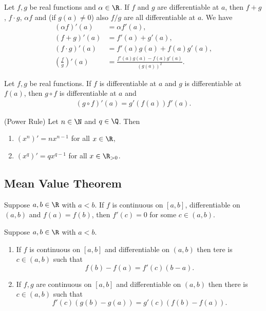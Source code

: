 \documentclass{article}
\begin{document}
\begin{theorem}[Ross, 28.3]
    Let $f,g$ be real functions and $\alpha\in\R$. If $f$ and $g$ are
    differentiable at $a$, then $f+g$, $f\cdot g$, $\alpha f$ and
    (if $g(a)\not=0$) also $f/g$ are all differentiable at $a$. We have
    \begin{align*}
        (\alpha f)'(a) &= \alpha f'(a),\\
        (f+g)'(a) &= f'(a) + g'(a),\\
        (f\cdot g)'(a) &= f'(a)g(a)+f(a)g'(a),\\
        \left(\frac{f}{g}\right)'(a)&=\frac{f'(a)g(a)-f(a)g'(a)}{(g(a))^2}.
    \end{align*} 
\end{theorem}

\begin{theorem}[Ross, 28.4]
    Let $f,g$ be real functions. If $f$ is differentiable at $a$ and $g$ is
    differentiable at $f(a)$, then $g\circ f$ is differentiable at $a$ and
    \begin{align*}
        (g\circ f)'(a) = g'(f(a))f'(a).
    \end{align*} 
\end{theorem}

\begin{theorem}(Power Rule)
    Let $n\in \N$ and $q\in\Q$. Then
    \begin{enumerate}[label=(\arabic*)]
        \item $(x^n)'=nx^{n-1}$ for all $x\in\R$,
        \item $(x^q)'=qx^{q-1}$ for all $x\in\R_{>0}$. 
    \end{enumerate} 
\end{theorem}

\subsection{Mean Value Theorem}

\begin{theorem}
    Suppose $a,b\in\R$ with $a<b$. If $f$ is continuous on $[a,b]$,
    differentiable on $(a,b)$ and $f(a)=f(b)$, then $f'(c)=0$ for some
    $c\in(a,b)$.
\end{theorem}

\begin{theorem}
    Suppose $a,b\in\R$ with $a<b$.
    \begin{enumerate}
        \item If $f$ is continuous on $[a,b]$ and differentiable on $(a,b)$
        then tere is $c\in(a,b)$ such that \[f(b)-f(a)=f'(c)(b-a).\]
        \item If $f,g$ are continuous on $[a,b]$ and differentiable on $(a,b)$
        then there is $c\in(a,b)$ such that
        \[f'(c)(g(b)-g(a))=g'(c)(f(b)-f(a)).\]
    \end{enumerate} 
\end{theorem}
\end{document}
